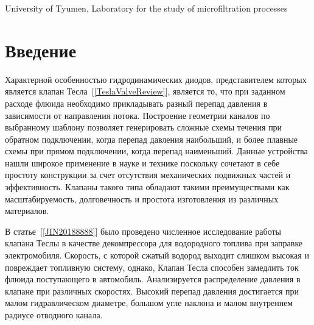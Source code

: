 \documentclass[10pt,a4paper]{book}
\begin{document}
    
    {University of Tyumen, \break
        Laboratory for the study of microfiltration processes}
    
    
    \MakeArticleHeader
    
    \section{Введение}\label{p:vved}
    Характерной особенностью гидродинамических диодов, представителем которых является клапан Тесла~[\ref{TeslaValveReview}], является то, что при заданном расходе флюида необходимо прикладывать разный перепад давления в зависимости от направления потока. Построение геометрии каналов по выбранному шаблону позволяет генерировать сложные схемы течения при обратном подключении, когда перепад давления наибольший, и более плавные схемы при прямом подключении, когда перепад наименьший. Данные устройства нашли широкое применение в науке и технике поскольку сочетают в себе простоту конструкции за счет отсутствия механических подвижных частей и эффективность. Клапаны такого типа обладают такими преимуществами как масштабируемость, долговечность и простота изготовления из различных материалов.
    
    В статье~[\ref{JIN20188888}] было проведено численное исследование работы клапана Теслы в качестве декомпрессора для водородного топлива при заправке электромобиля. Скорость, с которой сжатый водород выходит слишком высокая и повреждает топливную систему, однако, Клапан Тесла способен замедлить ток флюида поступающего в автомобиль. Анализируется распределение давления в клапане при различных скоростях. Высокий перепад давления достигается при малом гидравлическом диаметре, большом угле наклона и малом внутреннем радиусе отводного канала. 
    
\end{document}

